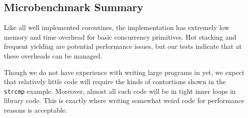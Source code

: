 \documentclass[acmsmall,anonymous,review]{acmart}\settopmatter{printfolios=true,printccs=false,printacmref=false}
\begin{document}
\subsection{Microbenchmark Summary}

Like all well implemented coroutines, the \charcoal{} implementation has extremely low memory and time overhead for basic concurrency primitives.
Hot stacking and frequent yielding are potential performance issues, but our tests indicate that at these overheads can be managed.

Though we do not have experience with writing large programs in \charcoal{} yet, we expect that relatively little code will require the kinds of contortions shown in the \texttt{strcmp} example.
Moreover, almost all such code will be in tight inner loops in library code.
This is exactly where writing somewhat weird code for performance reasons is acceptable.




\end{document}
